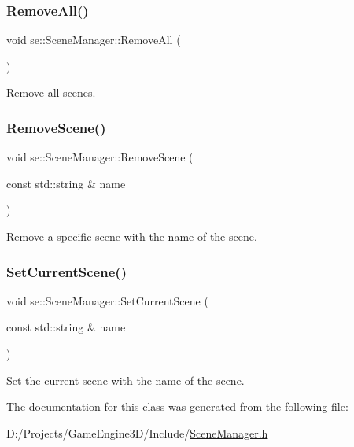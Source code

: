 \subsubsection{\texorpdfstring{Remove\+All()}{RemoveAll()}}
{\footnotesize\ttfamily void se\+::\+Scene\+Manager\+::\+Remove\+All (\begin{DoxyParamCaption}{ }\end{DoxyParamCaption})}

Remove all scenes. \mbox{\label{classse_1_1_scene_manager_a7912dae18fcbfff00194a63b88aec179}} 
\subsubsection{\texorpdfstring{Remove\+Scene()}{RemoveScene()}}
{\footnotesize\ttfamily void se\+::\+Scene\+Manager\+::\+Remove\+Scene (\begin{DoxyParamCaption}\item[{const std\+::string \&}]{name }\end{DoxyParamCaption})}

Remove a specific scene with the name of the scene. \mbox{\label{classse_1_1_scene_manager_a8eff0a05036942247f81fe4915ffce50}} 
\subsubsection{\texorpdfstring{Set\+Current\+Scene()}{SetCurrentScene()}}
{\footnotesize\ttfamily void se\+::\+Scene\+Manager\+::\+Set\+Current\+Scene (\begin{DoxyParamCaption}\item[{const std\+::string \&}]{name }\end{DoxyParamCaption})}

Set the current scene with the name of the scene. 

The documentation for this class was generated from the following file\+:\begin{DoxyCompactItemize}
\item 
D\+:/\+Projects/\+Game\+Engine3\+D/\+Include/\mbox{\hyperlink{_scene_manager_8h}{Scene\+Manager.\+h}}\end{DoxyCompactItemize}
